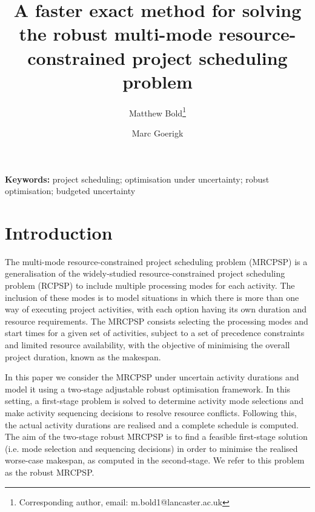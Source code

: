\documentclass[a4paper,abstracton]{scrartcl}
\begin{document}
\title{A faster exact method for solving the robust multi-mode resource-constrained project scheduling problem}

\author[1]{Matthew Bold\footnote{Corresponding author, email: m.bold1@lancaster.ac.uk}}
\author[2]{Marc Goerigk}


\date{}

\maketitle

\begin{abstract}
\end{abstract}

\noindent\textbf{Keywords:} project scheduling; optimisation under uncertainty; robust optimisation; budgeted uncertainty


\section{Introduction}
The multi-mode resource-constrained project scheduling problem (MRCPSP) is a generalisation of the widely-studied resource-constrained project scheduling problem (RCPSP) to include multiple processing modes for each activity. The inclusion of these modes is to model situations in which there is more than one way of executing project activities, with each option having its own duration and resource requirements. The MRCPSP consists selecting the processing modes and start times for a given set of activities, subject to a set of precedence constraints and limited resource availability, with the objective of minimising the overall project duration, known as the makespan.

In this paper we consider the MRCPSP under uncertain activity durations and model it using a two-stage adjustable robust optimisation framework. In this setting, a first-stage problem is solved to determine activity mode selections and make activity sequencing decisions to resolve resource conflicts. Following this, the actual activity durations are realised and a complete schedule is computed. The aim of the two-stage robust MRCPSP is to find a feasible first-stage solution (i.e. mode selection and sequencing decisions) in order to minimise the realised worse-case makespan, as computed in the second-stage. We refer to this problem as the robust MRCPSP.
\end{document}
